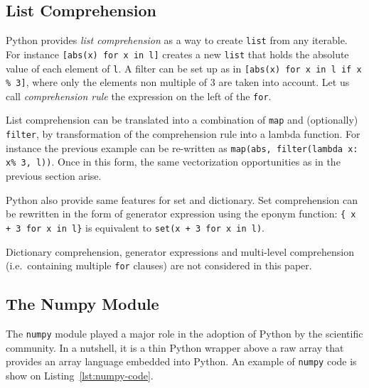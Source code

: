 \documentclass[10pt]{sigplanconf}
\begin{document}
\subsection{List Comprehension}

Python provides \emph{list comprehension} as a way to create \texttt{list} from
any iterable. For instance \texttt{[abs(x) for x in l]} creates a new
\texttt{list} that holds the absolute value of each element of \texttt{l}. A
filter can be set up as in  \texttt{[abs(x) for x in l if x \% 3]}, where only
the elements non multiple of 3 are taken into account. Let us call
\emph{comprehension rule} the expression on the left of the
\texttt{for}.

List comprehension can be translated into a combination of \texttt{map} and
(optionally) \texttt{filter}, by transformation of the comprehension rule into
a lambda function. For instance the previous example can be re-written as
\texttt{map(abs, filter(lambda x: x\% 3, l))}. Once in this form, the same
    vectorization opportunities as in the previous section arise.


Python also provide same features for set and dictionary.  Set comprehension
can be rewritten in the form of generator expression using the eponym function:
\texttt{\{ x + 3 for x in l\}} is equivalent to \texttt{set(x + 3 for x in l)}.

Dictionary comprehension, generator expressions and multi-level comprehension
(i.e.\ containing multiple \texttt{for} clauses) are not considered in this
paper.

\subsection{The Numpy Module}

The \texttt{numpy} module played a major role in the adoption of Python by the
scientific community. In a nutshell, it is a thin Python wrapper above a raw
array that provides an array language embedded into Python. An example of
\texttt{numpy} code is show on Listing~\ref{lst:numpy-code}.
\end{document}
